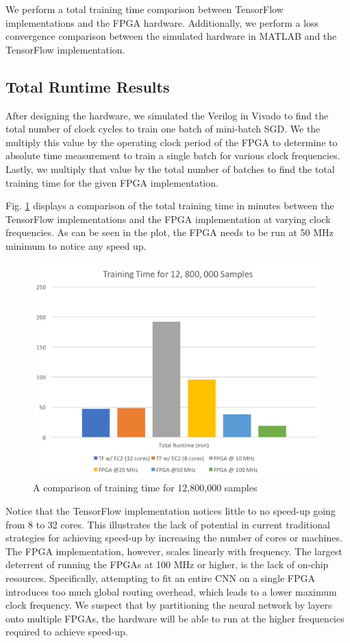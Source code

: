 We perform a total training time comparison between TensorFlow implementations and the FPGA hardware. Additionally, we perform a loss convergence comparison between the simulated hardware in MATLAB and the TensorFlow implementation.

\subsection{Total Runtime Results}
After designing the hardware, we simulated the Verilog in Vivado to find the total number of clock cycles to train one batch of mini-batch SGD. We the multiply this value by the operating clock period of the FPGA to determine to absolute time measurement to train a single batch for various clock frequencies. Lastly, we multiply that value by the total number of batches to find the total training time for the given FPGA implementation.

Fig. \ref{fig:total-runtime-plot} displays a comparison of the total training time in minutes between the TensorFlow implementations and the FPGA implementation at varying clock frequencies. As can be seen in the plot, the FPGA needs to be run at 50 MHz minimum to notice any speed up.
\begin{figure}[ht]
	\centering
	\includegraphics[scale=0.6]{total_runtime_plot.png}
	\caption{A comparison of training time for 12,800,000 samples}
	\label{fig:total-runtime-plot}
\end{figure}

Notice that the TensorFlow implementation notices little to no speed-up going from 8 to 32 cores. This illustrates the lack of potential in current traditional strategies for achieving speed-up by increasing the number of cores or machines. The FPGA implementation, however, scales linearly with frequency. The largest deterrent of running the FPGAs at 100 MHz or higher, is the lack of on-chip resources. Specifically, attempting to fit an entire CNN on a single FPGA introduces too much global routing overhead, which leads to a lower maximum clock frequency. We suspect that by partitioning the neural network by layers onto multiple FPGAs, the hardware will be able to run at the higher frequencies required to achieve speed-up.

